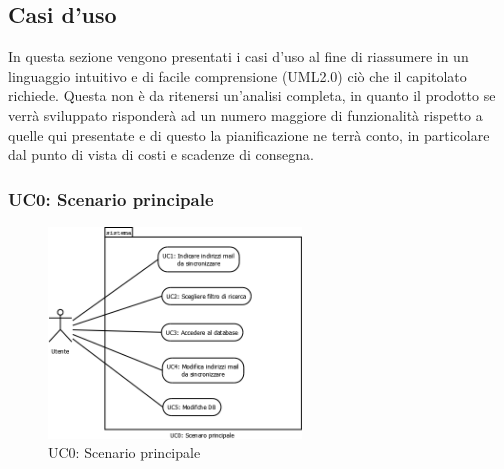 \subsection{Casi d'uso}

In questa sezione vengono presentati i casi d\textquoteright{}uso al fine di riassumere in un linguaggio intuitivo e di facile comprensione (UML2.0) ci\`{o} che il capitolato richiede. Questa non \`{e} da ritenersi un\textquoteright{}analisi completa, in quanto il prodotto se verr\`{a} sviluppato risponder\`{a} ad un numero maggiore di funzionalit\`{a} rispetto a quelle qui presentate e di questo la pianificazione ne terr\`{a} conto, in particolare dal punto di vista di costi e scadenze di consegna.

\subsubsection[UC0: Scenario principale]{UC0: Scenario principale}
\begin{figure}[H]
  \begin{center}
\includegraphics[width=0.60\textwidth]{img/UC0_ScenarioPrincipale.png}
\caption{UC0: Scenario principale}
\label{fig:UC0}
\end{center}
\end{figure}

